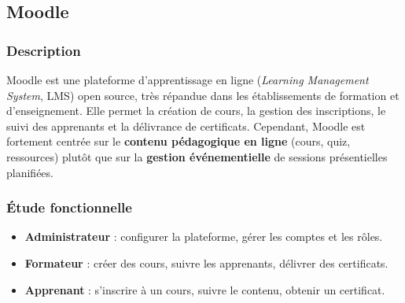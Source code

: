 \documentclass[12pt,a4paper,oneside]{report}
\begin{document}
\subsection{Moodle}
\subsubsection{Description}
Moodle est une plateforme d'apprentissage en ligne (\textit{Learning Management System}, LMS)
open source, très répandue dans les établissements de formation et d'enseignement. Elle permet
la création de cours, la gestion des inscriptions, le suivi des apprenants et la délivrance de
certificats. Cependant, Moodle est fortement centrée sur le \textbf{contenu pédagogique en
ligne} (cours, quiz, ressources) plutôt que sur la \textbf{gestion événementielle} de sessions
présentielles planifiées.

\subsubsection{Étude fonctionnelle}
\begin{itemize}[leftmargin=1.2cm]
  \item \textbf{Administrateur} : configurer la plateforme, gérer les comptes et les rôles.
  \item \textbf{Formateur} : créer des cours, suivre les apprenants, délivrer des certificats.
  \item \textbf{Apprenant} : s'inscrire à un cours, suivre le contenu, obtenir un certificat.
\end{itemize}
\end{document}
